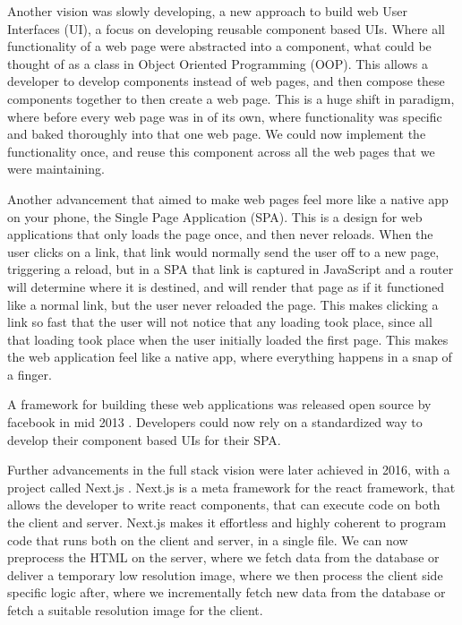 \documentclass[a4paper,12pt,twoside,openright,titlepage]{book}
\begin{document}
Another vision was slowly developing, a new approach to build web User Interfaces (UI), a focus on developing reusable component based UIs.
Where all functionality of a web page were abstracted into a component, what could be thought of as a class in Object Oriented Programming (OOP).
This allows a developer to develop components instead of web pages, and then compose these components together to then create a web page.
This is a huge shift in paradigm, where before every web page was in of its own, where functionality was specific and baked thoroughly into that one web page. We could now implement the functionality once, and reuse this component across all the web pages that we were maintaining.

Another advancement that aimed to make web pages feel more like a native app on your phone, the Single Page Application (SPA). This is a design for web applications that only loads the page once, and then never reloads. When the user clicks on a link, that link would normally send the user off to a new page, triggering a reload, but in a SPA that link is captured in JavaScript and a router will determine where it is destined, and will render that page as if it functioned like a normal link, but the user never reloaded the page. This makes clicking a link so fast that the user will not notice that any loading took place, since all that loading took place when the user initially loaded the first page.
This makes the web application feel like a native app, where everything happens in a snap of a finger.

A framework for building these web applications was released open source by facebook in mid 2013 \cite{react_release}.
Developers could now rely on a standardized way to develop their component based UIs for their SPA.

Further advancements in the full stack vision were later achieved in 2016, with a project called Next.js \cite{nextjs_release}.
Next.js is a meta framework for the react framework, that allows the developer to write react components, that can execute code on both the client and server. Next.js makes it effortless and highly coherent to program code that runs both on the client and server, in a single file. We can now preprocess the HTML on the server, where we fetch data from the database or deliver a temporary low resolution image, where we then process the client side specific logic after, where we incrementally fetch new data from the database or fetch a suitable resolution image for the client.
\end{document}
